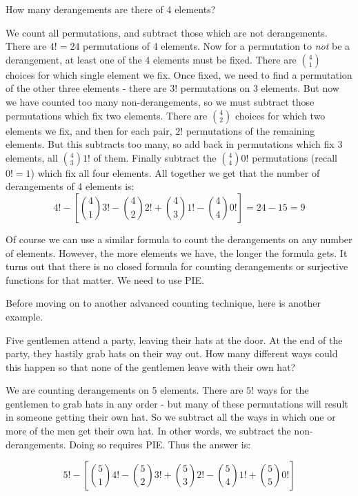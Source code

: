 \documentclass[12pt]{article}
\begin{document}
\begin{example}
  How many derangements are there of 4 elements?
  \begin{solution}
    We count all permutations, and subtract those which are not derangements.  There are $4! = 24$ permutations of 4 elements.  Now for a permutation to {\em not} be a derangement, at least one of the 4 elements must be fixed.  There are ${4 \choose 1}$ choices for which single element we fix.  Once fixed, we need to find a permutation of the other three elements - there are $3!$ permutations on 3 elements.  But now we have counted too many non-derangements, so we must subtract those permutations which fix two elements.  There are ${4 \choose 2}$ choices for which two elements we fix, and then for each pair, $2!$ permutations of the remaining elements.  But this subtracts too many, so add back in permutations which fix 3 elements, all ${4 \choose 3}1!$ of them.  Finally subtract the ${4 \choose 4}0!$ permutations (recall $0! = 1$) which fix all four elements.  All together we get that the number of derangements of 4 elements is:
    \[4! - \left[{4 \choose 1}3! - {4 \choose 2}2! + {4 \choose 3} 1! - {4 \choose 4}0!\right] = 24 - 15 = 9\]
    
  \end{solution}

\end{example}

Of course we can use a similar formula to count the derangements on any number of elements.  However, the more elements we have, the longer the formula gets.  It turns out that there is no closed formula for counting derangements or surjective functions for that matter.  We need to use PIE.  

Before moving on to another advanced counting technique, here is another example.

\begin{example}
  Five gentlemen attend a party, leaving their hats at the door.  At the end of the party, they hastily grab hats on their way out.  How many different ways could this happen so that none of the gentlemen leave with their own hat?
  
  \begin{solution}
    We are counting derangements on 5 elements.  There are $5!$ ways for the gentlemen to grab hats in any order - but many of these permutations will result in someone getting their own hat.  So we subtract all the ways in which one or more of the men get their own hat.  In other words, we subtract the non-derangements. Doing so requires PIE.  Thus the answer is:
    
    \[5! - \left[{5 \choose 1}4! - {5 \choose 2}3! + {5 \choose 3}2! - {5 \choose 4}1! + {5 \choose 5}0!\right]\]
  \end{solution}

\end{example}
\end{document}
